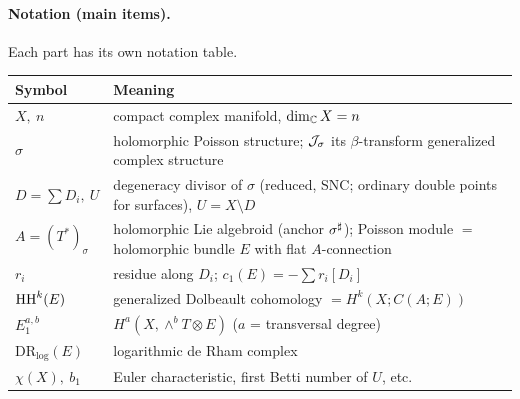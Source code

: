 \paragraph{Notation (main items).}Each part has its own notation table.
\begin{center}\small
\begin{tabular}{>{\raggedright\arraybackslash}p{3.2cm}>{\raggedright\arraybackslash}p{11.6cm}}
\toprule Symbol & Meaning\\\midrule
$X,\ n$ & compact complex manifold, $\dim_\mathbb C X=n$\\
$\sigma$ & holomorphic Poisson structure; $\mathcal J_\sigma$ its $\beta$-transform generalized complex structure\\
$D=\sum D_i,\ U$ & degeneracy divisor of $\sigma$ (reduced, SNC; ordinary double points for surfaces), $U=X\setminus D$\\
$A=(T^*)_\sigma$ & holomorphic Lie algebroid (anchor $\sigma^\sharp$); Poisson module $=$ holomorphic bundle $E$ with flat $A$-connection\\
$r_i$ & residue along $D_i$; $c_1(E)=-\sum r_i[D_i]$\\
$\mathrm{HH}^k(E)$ & generalized Dolbeault cohomology $=H^k(X;C(A;E))$\\
$E_1^{a,b}$ & $H^a(X,\wedge^bT\otimes E)$ ($a$ = transversal degree)\\
$\mathrm{DR}_{\log}(E)$ & logarithmic de Rham complex\\
$\chi(X),\ b_1$ & Euler characteristic, first Betti number of $U$, etc.\\\bottomrule
\end{tabular}
\end{center}
